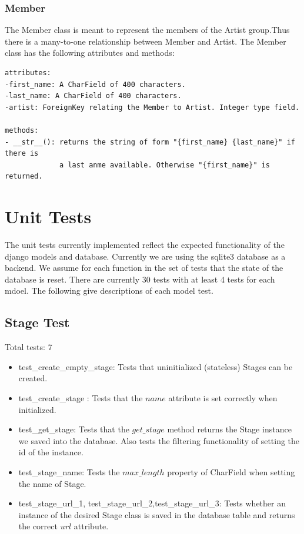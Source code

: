 \documentclass[12pt,english]{scrartcl}
\begin{document}
\subsubsection{Member}
The Member class is meant to represent the members of the Artist group.Thus there is a many-to-one relationship between Member and Artist.
The Member class has the following attributes and methods:
\begin{verbatim}
attributes:
-first_name: A CharField of 400 characters. 
-last_name: A CharField of 400 characters.
-artist: ForeignKey relating the Member to Artist. Integer type field.

methods:
- __str__(): returns the string of form "{first_name} {last_name}" if there is
             a last anme available. Otherwise "{first_name}" is returned.
\end{verbatim}

\section{Unit Tests}
The unit tests currently implemented reflect the expected functionality of the django models and database.
Currently we are using the sqlite3 database as a backend. We assume for each function in the set of tests that the state of the database is reset.
There are currently 30 tests with at least 4 tests for each mdoel. The following give descriptions of each model test. 

\subsection{Stage Test}
Total tests: 7
\begin{itemize}
\item test\_create\_empty\_stage: Tests that uninitialized (stateless) Stages can be created.

\item test\_create\_stage : Tests that the $name$ attribute is set correctly when initialized.
 
\item test\_get\_stage: Tests that the $get\_stage$ method returns the Stage instance we saved into the database. Also tests the filtering functionality of setting the id of the instance.

\item test\_stage\_name: Tests the $max\_length$ property of CharField when setting the name of Stage.

\item test\_stage\_url\_1, test\_stage\_url\_2,test\_stage\_url\_3: Tests whether an instance of the desired Stage class 
is saved in the database table and returns the correct $url$ attribute. 
\end{itemize} 
\end{document}
